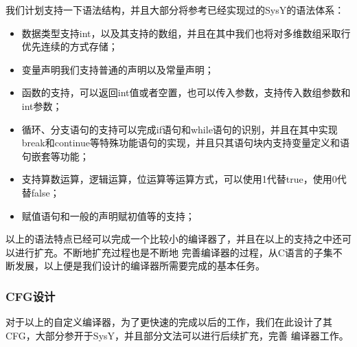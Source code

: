 \documentclass[UTF8]{ctexart}
\begin{document}
    我们计划支持一下语法结构，并且大部分将参考已经实现过的SysY\cite{SysY}的语法体系：
    \begin{itemize}
        \item 数据类型支持int，以及其支持的数组，并且在其中我们也将对多维数组采取行优先连续的方式存储；
        \item 变量声明我们支持普通的声明以及常量声明；
        \item 函数的支持，可以返回int值或者空置，也可以传入参数，支持传入数组参数和int参数；
        \item 循环、分支语句的支持可以完成if语句和while语句的识别，并且在其中实现break和continue等特殊功能语句的实现，并且只其语句块内支持变量定义和语句嵌套等功能；
        \item 支持算数运算，逻辑运算，位运算等运算方式，可以使用1代替true，使用0代替false；
        \item 赋值语句和一般的声明赋初值等的支持；
    \end{itemize}
    以上的语法特点已经可以完成一个比较小的编译器了，并且在以上的支持之中还可以进行扩充。不断地扩充过程也是不断地
    完善编译器的过程，从C语言的子集不断发展，以上便是我们设计的编译器所需要完成的基本任务。
\subsubsection{CFG设计}
    对于以上的自定义编译器，为了更快速的完成以后的工作，我们在此设计了其CFG，大部分参开于SysY\cite{SysY}，并且部分文法可以进行后续扩充，完善
    编译器工作。
\end{document}
